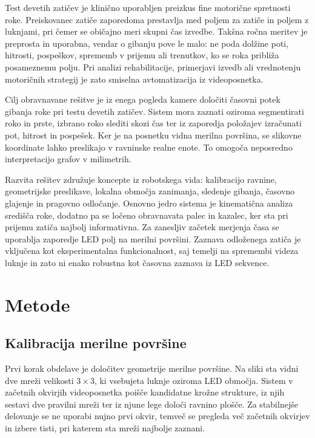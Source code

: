 \documentclass[journal,a4paper,twoside]{sty/IEEEtran}
\begin{document}
Test devetih zatičev je klinično uporabljen preizkus fine motorične spretnosti roke. Preiskovanec zatiče zaporedoma prestavlja med poljem za zatiče in poljem z luknjami, pri čemer se običajno meri skupni čas izvedbe. Takšna ročna meritev je preprosta in uporabna, vendar o gibanju pove le malo: ne poda dolžine poti, hitrosti, pospeškov, sprememb v prijemu ali trenutkov, ko se roka približa posameznemu polju. Pri analizi rehabilitacije, primerjavi izvedb ali vrednotenju motoričnih strategij je zato smiselna avtomatizacija iz videoposnetka.

Cilj obravnavane rešitve je iz enega pogleda kamere določiti časovni potek gibanja roke pri testu devetih zatičev. Sistem mora zaznati oziroma segmentirati roko in prste, izbrano roko slediti skozi čas ter iz zaporedja položajev izračunati pot, hitrost in pospešek. Ker je na posnetku vidna merilna površina, se slikovne koordinate lahko preslikajo v ravninske realne enote. To omogoča neposredno interpretacijo grafov v milimetrih.

Razvita rešitev združuje koncepte iz robotskega vida: kalibracijo ravnine, geometrijske preslikave, lokalna območja zanimanja, sledenje gibanja, časovno glajenje in pragovno odločanje. Osnovno jedro sistema je kinematična analiza središča roke, dodatno pa se ločeno obravnavata palec in kazalec, ker sta pri prijemu zatiča najbolj informativna. Za zanesljiv začetek merjenja časa se uporablja zaporedje LED polj na merilni površini. Zaznava odloženega zatiča je vključena kot eksperimentalna funkcionalnost, saj temelji na spremembi videza luknje in zato ni enako robustna kot časovna zaznava iz LED sekvence.

\section{Metode}

\subsection{Kalibracija merilne površine}

Prvi korak obdelave je določitev geometrije merilne površine. Na sliki sta vidni dve mreži velikosti $3 \times 3$, ki vsebujeta luknje oziroma LED območja. Sistem v začetnih okvirjih videoposnetka poišče kandidatne krožne strukture, iz njih sestavi dve pravilni mreži ter iz njune lege določi ravnino plošče. Za stabilnejše delovanje se ne uporabi nujno prvi okvir, temveč se pregleda več začetnih okvirjev in izbere tisti, pri katerem sta mreži najbolje zaznani.
\end{document}
